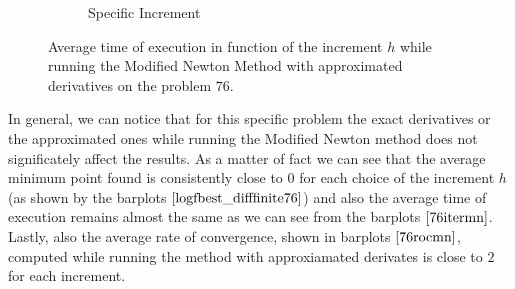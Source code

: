 \begin{figure}[htbp]
\begin{subfigure}[t]{0.45\textwidth}
        \caption{Specific Increment }
    \end{subfigure}
    \caption{ \small Average time of execution in function of the increment $h$  while running the Modified Newton Method with approximated derivatives on the problem $76$.}
    \label{76itermn}
\end{figure}

In general, we can notice that for this specific problem the exact derivatives or the approximated ones while running the Modified Newton method does not significately affect the results. As a matter of fact we can see that the average minimum point found is consistently close to $0$ for each choice of the increment $h$ (as shown by the barplots $\eqref{logfbest_difffinite76}$) and also the average time of execution remains almost the same as we can see from the barplots $\eqref{76itermn}$. 
Lastly, also the average rate of convergence, shown in barplots $\eqref{76rocmn}$,  computed while running the method with approxiamated derivates is close to $2$ for each increment.


